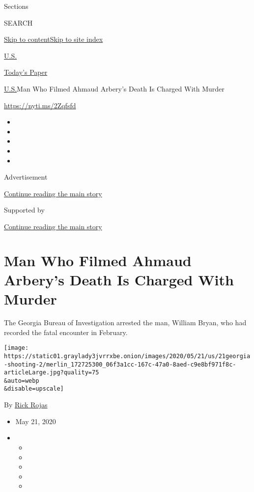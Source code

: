 Sections

SEARCH

\protect\hyperlink{site-content}{Skip to
content}\protect\hyperlink{site-index}{Skip to site index}

\href{https://www.nytimes3xbfgragh.onion/section/us}{U.S.}

\href{https://myaccount.nytimes3xbfgragh.onion/auth/login?response_type=cookie\&client_id=vi}{}

\href{https://www.nytimes3xbfgragh.onion/section/todayspaper}{Today's
Paper}

\href{/section/us}{U.S.}\textbar{}Man Who Filmed Ahmaud Arbery's Death
Is Charged With Murder

\url{https://nyti.ms/2Zqfsfd}

\begin{itemize}
\item
\item
\item
\item
\item
\end{itemize}

Advertisement

\protect\hyperlink{after-top}{Continue reading the main story}

Supported by

\protect\hyperlink{after-sponsor}{Continue reading the main story}

\hypertarget{man-who-filmed-ahmaud-arberys-death-is-charged-with-murder}{%
\section{Man Who Filmed Ahmaud Arbery's Death Is Charged With
Murder}\label{man-who-filmed-ahmaud-arberys-death-is-charged-with-murder}}

The Georgia Bureau of Investigation arrested the man, William Bryan, who
had recorded the fatal encounter in February.

\texttt{[image: https://static01.graylady3jvrrxbe.onion/images/2020/05/21/us/21georgia-shooting-2/merlin\_172725300\_06f3a1cc-167c-47a0-8aed-c9e8bf971f8c-articleLarge.jpg?quality=75\\\&auto=webp\\\&disable=upscale]}

By \href{https://www.nytimes3xbfgragh.onion/by/rick-rojas}{Rick Rojas}

\begin{itemize}
\item
  May 21, 2020
\item
  \begin{itemize}
  \item
  \item
  \item
  \item
  \item
  \end{itemize}
\end{itemize}

